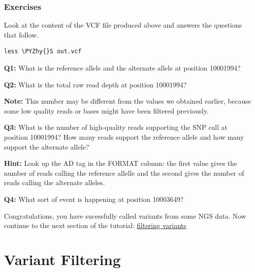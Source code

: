 \documentclass[11pt]{article}
\makeatletter
\def\PYZhy{\char`\-}
\newcommand{\boxspacing}{\kern\kvtcb@left@rule\kern\kvtcb@boxsep}
\newcommand{\prompt}[4]{

        {\ttfamily\llap{{\color{blue}\LARGE\faKeyboardO\hspace{3pt}#4}}\vspace{-\baselineskip}}
    }
\makeatother
\begin{document}
    \hypertarget{exercises}{%
\subsubsection{Exercises}\label{exercises}}

Look at the content of the VCF file produced above and answers the
questions that follow.

    \begin{tcolorbox}[breakable, size=fbox, boxrule=1pt, pad at break*=1mm,colback=cellbackground, colframe=cellborder]
\prompt{In}{incolor}{ }{\boxspacing}
\begin{Verbatim}[commandchars=\\\{\}]
less \PYZhy{}S out.vcf
\end{Verbatim}
\end{tcolorbox}

    \textbf{Q1:} What is the reference allele and the alternate allele at
position 10001994?

\textbf{Q2:} What is the total raw read depth at position 10001994?

\textbf{Note:} This number may be different from the values we obtained
earlier, because some low quality reads or bases might have been
filtered previously.

\textbf{Q3:} What is the number of high-quality reads supporting the SNP
call at position 10001994? How many reads support the reference allele
and how many support the alternate allele?

\textbf{Hint:} Look up the AD tag in the FORMAT column: the first value
gives the number of reads calling the reference allelle and the second
gives the number of reads calling the alternate alleles.

\textbf{Q4:} What sort of event is happening at position 10003649?

    Congratulations, you have sucessfully called variants from some NGS
data. Now continue to the next section of the tutorial:
\href{filtering.ipynb}{filtering variants}





\newpage





    \hypertarget{variant-filtering}{%
\section{Variant Filtering}\label{variant-filtering}}
\end{document}

